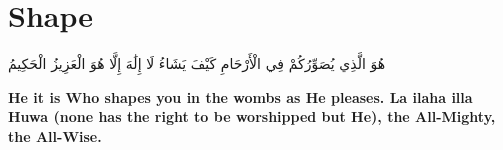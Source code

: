 \chapter{Shape}
\begin{center}
    {\Huge    
        \begin{Arabic}
            هُوَ الَّذِي يُصَوِّرُكُمْ فِي الْأَرْحَامِ كَيْفَ يَشَاءُ لَا إِلَٰهَ إِلَّا هُوَ الْعَزِيزُ الْحَكِيمُ
        \end{Arabic}
    }    
\end{center}
\vspace*{\fill}
\vspace{3cm}
\begin{center}
    \Large \textbf{He it is Who shapes you in the wombs as He pleases. La ilaha illa Huwa (none has the right to be worshipped but He), the All-Mighty, the All-Wise.}
\end{center}
